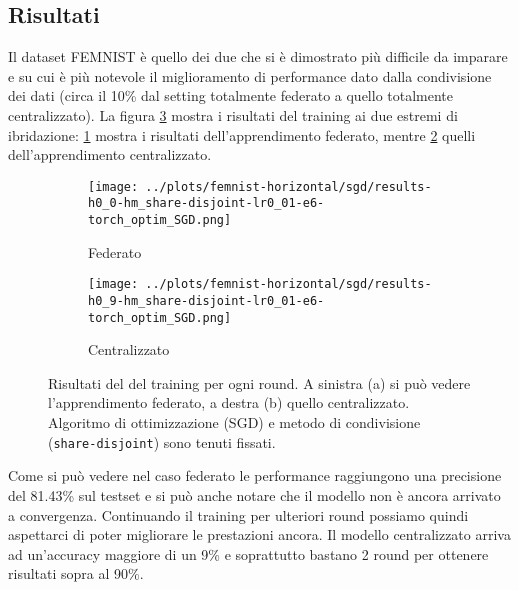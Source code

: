 \subsection{Risultati}
Il dataset FEMNIST è quello dei due che si è dimostrato più difficile 
da imparare e su cui è più notevole il miglioramento di performance 
dato dalla condivisione dei dati (circa il 10\% dal setting totalmente
federato a quello totalmente centralizzato). La figura \ref{fig:femnistrandom}
mostra i risultati del training ai due estremi di ibridazione:
\ref{fig:femnistrandoma} mostra i risultati dell'apprendimento federato,
mentre \ref{fig:femnistrandomb} quelli dell'apprendimento centralizzato.
\begin{figure}[hb]  %
    \centering
    \begin{subfigure}[b]{0.49\textwidth}
        \centering
        \texttt{[image: ../plots/femnist-horizontal/sgd/results-h0\_0-hm\_share-disjoint-lr0\_01-e6-torch\_optim\_SGD.png]}
        \caption{Federato}
        \label{fig:femnistrandoma}
    \end{subfigure}
    \hfill
    \begin{subfigure}[b]{0.49\textwidth}
        \centering
        \texttt{[image: ../plots/femnist-horizontal/sgd/results-h0\_9-hm\_share-disjoint-lr0\_01-e6-torch\_optim\_SGD.png]}
        \caption{Centralizzato}
        \label{fig:femnistrandomb}
    \end{subfigure}
    
    \caption{
        Risultati del del training per ogni round. A sinistra (a) si può 
        vedere l'apprendimento federato, a destra (b) quello centralizzato.
        Algoritmo di ottimizzazione (SGD) e metodo di condivisione 
        (\texttt{share-disjoint}) sono tenuti fissati.
    }
    \label{fig:femnistrandom}
\end{figure}


Come si può vedere nel caso federato 
le performance raggiungono una precisione del 81.43\% sul testset 
e si può anche notare che il modello non è ancora arrivato a convergenza.
Continuando il training per ulteriori round possiamo quindi aspettarci 
di poter migliorare le prestazioni ancora.
Il modello centralizzato arriva ad un'accuracy maggiore di un 9\% e 
soprattutto bastano 2 round per ottenere risultati sopra al 90\%.

